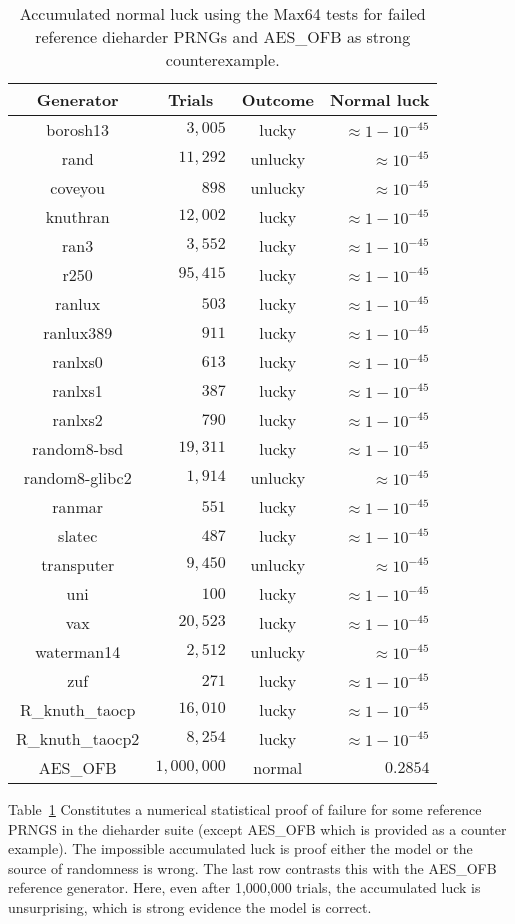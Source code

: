 \begin{table}
\caption{\label{tab:maxluck}Accumulated normal luck using the Max64 tests for failed reference dieharder PRNGs and AES\_OFB as strong counterexample.}
\begin{tabular}{|c|r|c|r|}
\multicolumn{1}{c}{Generator} &
\multicolumn{1}{c}{Trials} &
\multicolumn{1}{c}{Outcome} &
\multicolumn{1}{c}{Normal luck} \\
\hline
borosh13 & $3,005$ & lucky &  $\approx 1-10^{-45}$ \\
rand & $11,292$ & unlucky &  $\approx 10^{-45}$ \\
coveyou & $898$ & unlucky & $\approx 10^{-45}$ \\
knuthran & $12,002$ & lucky & $\approx 1-10^{-45}$ \\
ran3 & $3,552$ & lucky & $\approx 1-10^{-45}$ \\
r250 & $95,415$ & lucky & $\approx 1-10^{-45}$ \\
ranlux & $503$ & lucky & $\approx 1-10^{-45}$ \\
ranlux389 & $911$ & lucky & $\approx 1-10^{-45}$ \\
ranlxs0 & $613$ & lucky & $\approx 1-10^{-45}$ \\
ranlxs1 & $387$ & lucky & $\approx 1-10^{-45}$ \\
ranlxs2 & $790$ & lucky & $\approx 1-10^{-45}$ \\
random8-bsd & $19,311$ & lucky & $\approx 1-10^{-45}$ \\
random8-glibc2 & $1,914$ & unlucky & $\approx 10^{-45}$ \\
ranmar & $551$ & lucky & $\approx 1-10^{-45}$ \\
slatec & $487$ & lucky & $\approx 1-10^{-45}$ \\
transputer & $9,450$  & unlucky & $\approx 10^{-45}$ \\
uni & $100$ & lucky & $\approx 1-10^{-45}$ \\
vax & $20,523$ & lucky & $\approx 1-10^{-45}$ \\
waterman14 & $2,512$ & unlucky & $\approx 10^{-45}$ \\
zuf & $271$ & lucky & $\approx 1-10^{-45}$ \\
R\_knuth\_taocp & $16,010$ & lucky & $\approx 1-10^{-45}$ \\
R\_knuth\_taocp2 & $8,254$ & lucky & $\approx 1-10^{-45}$ \\
AES\_OFB & $1,000,000$ & normal & $0.2854$ \\
\hline
\end{tabular}
\end{table}
Table~\ref{tab:maxluck} Constitutes a numerical statistical proof of failure for some reference PRNGS in the dieharder suite (except AES\_OFB which is provided as a counter example).  The impossible accumulated luck is proof either the model or the source of randomness is wrong.  The last row contrasts this with the AES\_OFB reference generator.  Here, even after 1,000,000 trials, the accumulated luck is unsurprising, which is strong evidence the model is correct.

